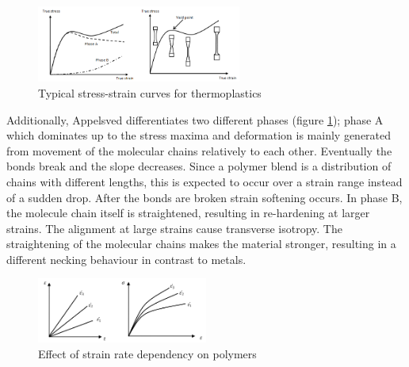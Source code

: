 \begin{figure}[H]
    \centering
    \includegraphics[width=0.6\textwidth]{chapter_2/figures/SSpolymers.PNG}
    \caption{Typical stress-strain curves for thermoplastics \cite{Appelsved2012InvestigationModels}}
    \label{fig:SSpolymers}
\end{figure}
Additionally, Appelsved differentiates two different phases (figure \ref{fig:SSpolymers}); phase A which dominates up to the stress maxima and deformation is mainly generated from movement of the molecular chains relatively to each other. Eventually the bonds break and the slope decreases. Since a polymer blend is a distribution of chains with different lengths, this is expected to occur over a strain range instead of a sudden drop. After the bonds are broken strain softening occurs. In phase B, the molecule chain itself is straightened, resulting in re-hardening at larger strains. The alignment at large strains cause transverse isotropy. The straightening of the molecular chains makes the material stronger, resulting in a different necking behaviour in contrast to metals. 

\begin{figure}[H]
    \centering
    \includegraphics[width=0.5\textwidth]{chapter_2/figures/Strainrate.PNG}
    \caption{Effect of strain rate dependency on polymers \cite{Appelsved2012InvestigationModels}}
    \label{fig:Strainrate}
\end{figure}
